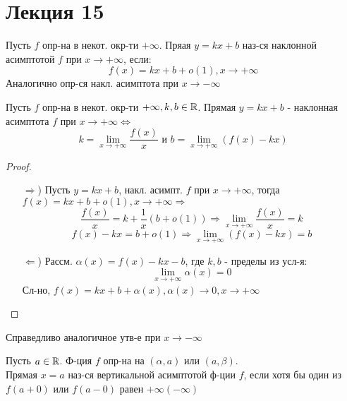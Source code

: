 \section{Лекция 15}
\begin{definition}
Пусть $f$ опр-на в некот. окр-ти $+\infty$. Пряая $y = kx + b$ наз-ся наклонной асимптотой $f$ при $x \rightarrow +\infty$, если:
\[
f(x) = kx + b + o(1), x \rightarrow +\infty
\]
Аналогично опр-ся накл. асимптота при $x \rightarrow -\infty$
\end{definition}
\begin{theorem}
Пусть $f$ опр-на в некот. окр-ти $+\infty, k, b \in \mathbb{R}$. Прямая $y = kx + b$ - наклонная асимптота $f$ при $x \rightarrow +\infty \iff$
\[
k = \lim_{x\to +\infty} \frac{f(x)}{x} \text{ и } b = \lim_{x\to +\infty}(f(x) - kx)
\]
\end{theorem}
\begin{proof}
\begin{itemize}
  \item [$\Rightarrow$) ] Пусть $y = kx + b$, накл. асимпт. $f$ при $x \rightarrow +\infty$, тогда $f(x) = kx + b + o(1), x \rightarrow +\infty \Rightarrow$
    \[
      \frac{f(x)}{x} = k + \frac{1}{x}(b + o(1)) \Rightarrow \lim_{x\to +\infty} \frac{f(x)}{x} = k
    \]
    \[
      f(x) - kx = b + o(1) \Rightarrow \lim_{x\to +\infty} (f(x) - kx) = b
    \]
  \item [$\Leftarrow$)] Рассм. $\alpha(x) = f(x) - kx - b$, где $k, b$ - пределы из усл-я:
    \[
    \lim_{x\to +\infty}  \alpha(x) = 0
    \]
    Сл-но, $f(x) = kx + b + \alpha(x), \alpha(x) \rightarrow 0, x \rightarrow +\infty$
\end{itemize}
\end{proof}
\begin{note}
Справедливо аналогичное утв-е при $x \rightarrow -\infty$
\end{note}
\begin{definition}
Пусть $a \in \mathbb{R}$. Ф-ция $f$ опр-на на $(\alpha, a)$ или $(a, \beta)$. \\
Прямая $x = a$ наз-ся вертикальной асимптотой ф-ции $f$, если хотя бы один из $f(a + 0)$ или $f(a - 0)$ равен $+\infty(-\infty)$
\end{definition}
